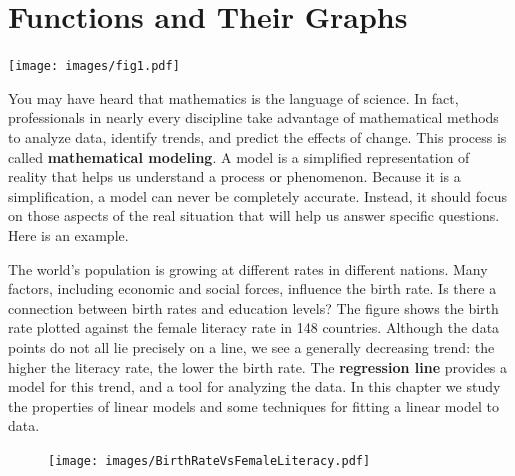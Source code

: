 \documentclass[10pt,]{book}
\newcommand{\terminology}[1]{\textbf{#1}}
\theoremstyle{plain}
\theoremstyle{definition}
\theoremstyle{definition}
\theoremstyle{definition}
\theoremstyle{definition}
\numberwithin{equation}{section}
\begin{document}
\chapter[Functions and Their Graphs]{Functions and Their Graphs}\label{chap1}
\typeout{************************************************}
\typeout{************************************************}
\texttt{[image: images/fig1.pdf]}%
\par
You may have heard that mathematics is the language of science.  In fact, professionals in nearly every discipline take advantage of mathematical methods to analyze data, identify trends, and predict the effects of change.  This process is called \terminology{mathematical modeling}.  A model is a simplified representation of reality that helps us understand a process or phenomenon.  Because it is a simplification, a model can never be completely accurate.  Instead, it should focus on those aspects of the real situation that will help us answer specific questions. Here is an example. %
\par
The world's population is growing at different rates in different nations.  Many factors, including economic and social forces, influence the birth rate.  Is there a connection between birth rates and education levels?  The figure shows the birth rate plotted against the female literacy rate in 148 countries.  Although the data points do not all lie precisely on a line, we see a generally decreasing trend:  the higher the literacy rate, the lower the birth rate.  The \terminology{regression line} provides a model for this trend, and a tool for analyzing the data.  In this chapter we study the properties of linear models and some techniques for fitting a linear model to data.%
\leavevmode%
\begin{figure}
\centering
\texttt{[image: images/BirthRateVsFemaleLiteracy.pdf]}\end{figure}
\end{document}
